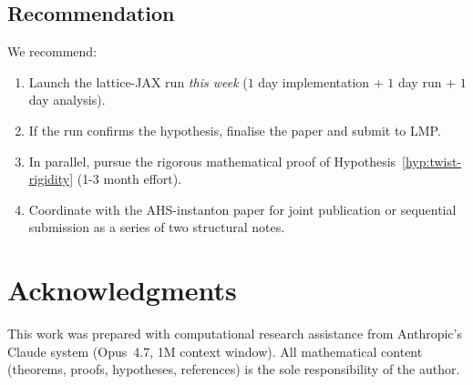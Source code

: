 \documentclass[11pt,a4paper]{amsart}
\theoremstyle{definition}
\begin{document}
\subsection{Recommendation}
We recommend:
\begin{enumerate}[label=\arabic*.,leftmargin=2em]
\item Launch the lattice-JAX run \emph{this week} ($1$ day implementation
+ $1$ day run + $1$ day analysis).
\item If the run confirms the hypothesis, finalise the paper and
submit to LMP.
\item In parallel, pursue the rigorous mathematical proof of
Hypothesis~\ref{hyp:twist-rigidity} (1-3 month effort).
\item Coordinate with the AHS-instanton paper for joint publication
or sequential submission as a series of two structural notes.
\end{enumerate}

\section*{Acknowledgments}
This work was prepared with computational research assistance from
Anthropic's Claude system (Opus~4.7, 1M context window). All
mathematical content (theorems, proofs, hypotheses, references) is
the sole responsibility of the author.
\end{document}

